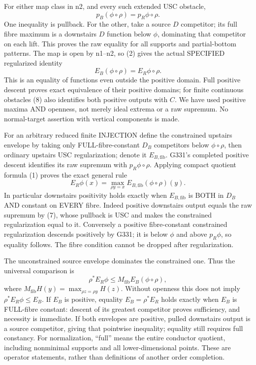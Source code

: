 For either map class in n2, and every such extended USC obstacle,
\[
p_B(\phi\circ\rho)=p_R\phi\circ\rho.                \tag{9}
\]
One inequality is pullback. For the other, take a source $D$ competitor; its full fibre maximum is a downstairs $D$ function below $\phi$, dominating that competitor on each lift. This proves the raw equality for all supports and partial-bottom patterns. The map is open by n1--n2, so (2) gives the actual SPECIFIED regularized identity
\[
E_B(\phi\circ\rho)=E_R\phi\circ\rho.                \tag{10}
\]
This is an equality of functions even outside the positive domain. Full positive descent proves exact equivalence of their positive domains; for finite continuous obstacles (8) also identifies both positive outputs with $C$. We have used positive maxima AND openness, not merely ideal extrema or a raw supremum. No normal-target assertion with vertical components is made.

For an arbitrary reduced finite INJECTION define the constrained upstairs envelope by taking only FULL-fibre-constant $D_B$ competitors below $\phi\circ\rho$, then ordinary upstairs USC regularization; denote it $E_{B,\mathrm{fib}}$. G331's completed positive descent identifies its raw supremum with $p_R\phi\circ\rho$. Applying compact quotient formula (1) proves the exact general rule
\[
E_R\phi(x)=\max_{\rho y=x}E_{B,\mathrm{fib}}(\phi\circ\rho)(y). \tag{11}
\]
In particular downstairs positivity holds exactly when $E_{B,\mathrm{fib}}$ is BOTH in $D_B$ AND constant on EVERY fibre. Indeed positive downstairs output equals the raw supremum by (7), whose pullback is USC and makes the constrained regularization equal to it. Conversely a positive fibre-constant constrained regularization descends positively by G331; it is below $\phi$ and above $p_R\phi$, so equality follows. The fibre condition cannot be dropped after regularization.

The unconstrained source envelope dominates the constrained one. Thus the universal comparison is
\[
\rho^*E_R\phi\le M_{\mathrm{fib}} E_B(\phi\circ\rho),  \tag{12}
\]
where $M_{\mathrm{fib}}H(y)=\max_{\rho z=\rho y}H(z)$. Without openness this does not imply $\rho^*E_R\phi\le E_B$. If $E_B$ is positive, equality $E_B=\rho^*E_R$ holds exactly when $E_B$ is FULL-fibre constant: descent of its greatest competitor proves sufficiency, and necessity is immediate. If both envelopes are positive, pulled downstairs output is a source competitor, giving that pointwise inequality; equality still requires full constancy. For normalization, ``full'' means the entire conductor quotient, including nonminimal supports and all lower-dimensional points. These are operator statements, rather than definitions of another order completion.
